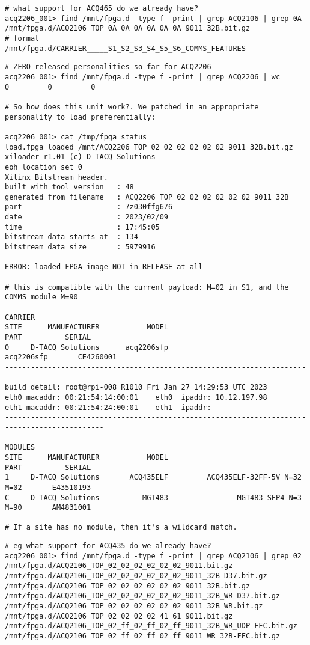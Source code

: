 \documentclass[]{article}
\begin{document}
\begin{lstlisting}[style=bashstyle,frame=single]
# what support for ACQ465 do we already have?
acq2206_001> find /mnt/fpga.d -type f -print | grep ACQ2106 | grep 0A
/mnt/fpga.d/ACQ2106_TOP_0A_0A_0A_0A_0A_0A_9011_32B.bit.gz
# format
/mnt/fpga.d/CARRIER_____S1_S2_S3_S4_S5_S6_COMMS_FEATURES
\end{lstlisting}

\begin{lstlisting}[style=bashstyle,frame=single]
# ZERO released personalities so far for ACQ2206
acq2206_001> find /mnt/fpga.d -type f -print | grep ACQ2206 | wc
0         0         0

# So how does this unit work?. We patched in an appropriate personality to load preferentially:

acq2206_001> cat /tmp/fpga_status
load.fpga loaded /mnt/ACQ2206_TOP_02_02_02_02_02_02_9011_32B.bit.gz
xiloader r1.01 (c) D-TACQ Solutions
eoh_location set 0
Xilinx Bitstream header.
built with tool version   : 48
generated from filename   : ACQ2206_TOP_02_02_02_02_02_02_9011_32B
part                      : 7z030ffg676
date                      : 2023/02/09
time                      : 17:45:05
bitstream data starts at  : 134
bitstream data size       : 5979916

ERROR: loaded FPGA image NOT in RELEASE at all

# this is compatible with the current payload: M=02 in S1, and the COMMS module M=90

CARRIER
SITE      MANUFACTURER           MODEL                                PART          SERIAL
0     D-TACQ Solutions      acq2206sfp                          acq2206sfp       CE4260001
---------------------------------------------------------------------------------------------
build detail: root@rpi-008 R1010 Fri Jan 27 14:29:53 UTC 2023
eth0 macaddr: 00:21:54:14:00:01    eth0  ipaddr: 10.12.197.98
eth1 macaddr: 00:21:54:24:00:01    eth1  ipaddr:
---------------------------------------------------------------------------------------------

MODULES
SITE      MANUFACTURER           MODEL                                PART          SERIAL
1     D-TACQ Solutions       ACQ435ELF         ACQ435ELF-32FF-5V N=32 M=02       E43510193
C     D-TACQ Solutions          MGT483                MGT483-SFP4 N=3 M=90       AM4831001

# If a site has no module, then it's a wildcard match.
\end{lstlisting}
\pagebreak
\begin{lstlisting}[style=bashstyle,frame=single]
# eg what support for ACQ435 do we already have?
acq2206_001> find /mnt/fpga.d -type f -print | grep ACQ2106 | grep 02
/mnt/fpga.d/ACQ2106_TOP_02_02_02_02_02_02_9011.bit.gz
/mnt/fpga.d/ACQ2106_TOP_02_02_02_02_02_02_9011_32B-D37.bit.gz
/mnt/fpga.d/ACQ2106_TOP_02_02_02_02_02_02_9011_32B.bit.gz
/mnt/fpga.d/ACQ2106_TOP_02_02_02_02_02_02_9011_32B_WR-D37.bit.gz
/mnt/fpga.d/ACQ2106_TOP_02_02_02_02_02_02_9011_32B_WR.bit.gz
/mnt/fpga.d/ACQ2106_TOP_02_02_02_02_41_61_9011.bit.gz
/mnt/fpga.d/ACQ2106_TOP_02_ff_02_ff_02_ff_9011_32B_WR_UDP-FFC.bit.gz
/mnt/fpga.d/ACQ2106_TOP_02_ff_02_ff_02_ff_9011_WR_32B-FFC.bit.gz
\end{lstlisting}
\end{document}
